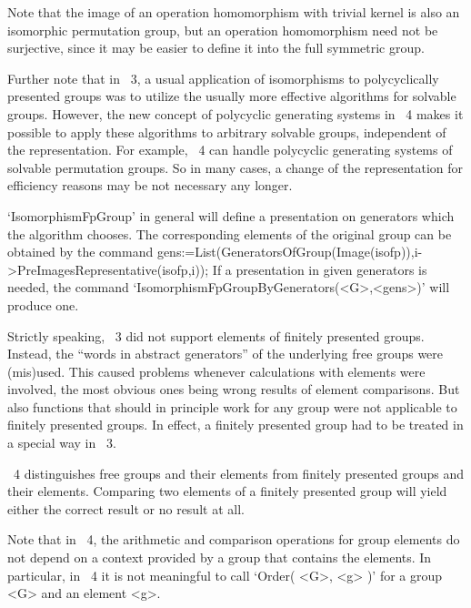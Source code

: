 Note that the image of an operation homomorphism with trivial kernel is
also an isomorphic permutation group,
but an operation homomorphism need not be surjective,
since it may be easier to define it into the full symmetric group.

Further note that in {\GAP}~3, a usual application of isomorphisms to
polycyclically presented groups was to utilize the usually more effective
algorithms for solvable groups.
However, the new concept of polycyclic generating systems in {\GAP}~4
makes it possible to apply these algorithms to arbitrary solvable groups,
independent of the representation.
For example, {\GAP}~4 can handle polycyclic generating systems of
solvable permutation groups.
So in many cases, a change of the representation for efficiency reasons
may be not necessary any longer.

`IsomorphismFpGroup' in general will define a presentation on generators
which the algorithm chooses. The corresponding elements of the original
group can be obtained by the command
\begintt
gens:=List(GeneratorsOfGroup(Image(isofp)),i->PreImagesRepresentative(isofp,i));
\endtt
If a presentation in given generators is needed, the command
`IsomorphismFpGroupByGenerators(<G>,<gens>)' will produce one.



Strictly speaking, {\GAP}~3 did not support elements of finitely
presented groups.
Instead, the ``words in abstract generators'' of the underlying free
groups were (mis)used.
This caused problems whenever calculations with elements were involved,
the most obvious ones being wrong results of element comparisons.
But also functions that should in principle work for any group were not
applicable to finitely presented groups.
In effect, a finitely presented group had to be treated in a special way
in {\GAP}~3.

{\GAP}~4 distinguishes free groups and their elements from finitely
presented groups and their elements.
Comparing two elements of a finitely presented group will yield either
the correct result or no result at all.

Note that in {\GAP}~4, the arithmetic and comparison operations for
group elements do not depend on a context provided by a group
that contains the elements.
In particular,
in {\GAP}~4 it is not meaningful to call `Order( <G>, <g> )' for a group
<G> and an element <g>.



